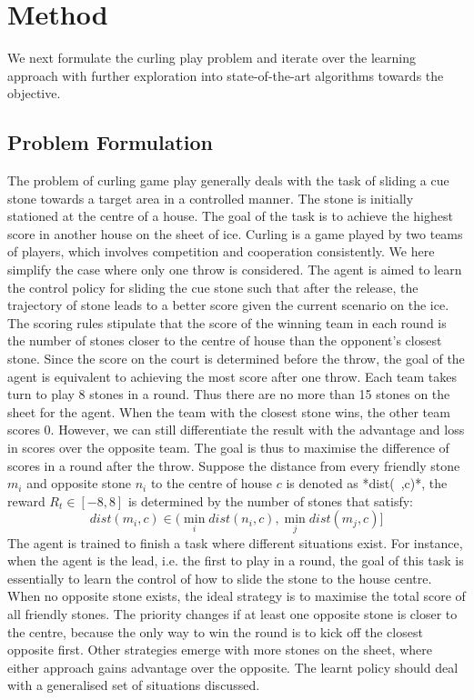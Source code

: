 \documentclass[oneside,11pt,a4paper]{article}
\begin{document}
\newpage
\section{Method}


We next formulate the curling play problem and iterate over the learning approach with further exploration into state-of-the-art algorithms towards the objective.

\subsection{Problem Formulation}
The problem of curling game play generally deals with the task of sliding a cue stone towards a target area in a controlled manner. The stone is initially stationed at the centre of a house. The goal of the task is to achieve the highest score in another house on the sheet of ice. Curling is a game played by two teams of players, which involves competition and cooperation consistently. We here simplify the case where only one throw is considered. The agent is aimed to learn the control policy for sliding the cue stone such that after the release, the trajectory of stone leads to a better score given the current scenario on the ice. The scoring rules stipulate that the score of the winning team in each round is the number of stones closer to the centre of house than the opponent's closest stone. Since the score on the court is determined before the throw, the goal of the agent is equivalent to achieving the most score after one throw. Each team takes turn to play 8 stones in a round. Thus there are no more than 15 stones on the sheet for the agent. When the team with the closest stone wins, the other team scores 0. However, we can still differentiate the result with the advantage and loss in scores over the opposite team. The goal is thus to maximise the difference of scores in a round after the throw. Suppose the distance from every friendly stone $m_i$ and opposite stone $n_i$ to the centre of house $c$ is denoted as *dist(~,c)*, the reward $R_t\in[-8,8]$ is determined by the number of stones that satisfy:
$$
dist(m_i, c) \in (\min_i dist(n_i, c), \min_j dist(m_j, c)]
$$
The agent is trained to finish a task where different situations exist. For instance, when the agent is the lead, i.e. the first to play in a round, the goal of this task is essentially to learn the control of how to slide the stone to the house centre. When no opposite stone exists, the ideal strategy is to maximise the total score of all friendly stones. The priority changes if at least one opposite stone is closer to the centre, because the only way to win the round is to kick off the closest opposite first. Other strategies emerge with more stones on the sheet, where either approach gains advantage over the opposite. The learnt policy should deal with a generalised set of situations discussed.
\end{document}
